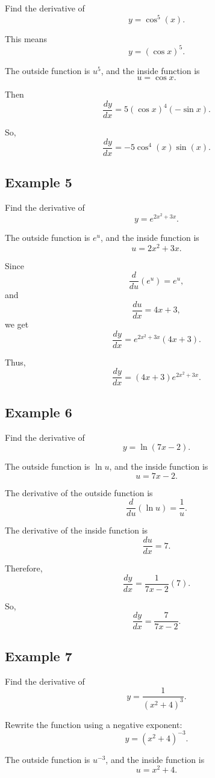 \documentclass[12pt]{article}
\begin{document}
	Find the derivative of
	\[
	y=\cos^5(x).
	\]
	
	This means
	\[
	y=(\cos x)^5.
	\]
	
	The outside function is \(u^5\), and the inside function is
	\[
	u=\cos x.
	\]
	
	Then
	\[
	\frac{dy}{dx}=5(\cos x)^4(-\sin x).
	\]
	
	So,
	\[
	\boxed{\frac{dy}{dx}=-5\cos^4(x)\sin(x).}
	\]
	
	\subsection*{Example 5}
	
	Find the derivative of
	\[
	y=e^{2x^2+3x}.
	\]
	
	The outside function is \(e^u\), and the inside function is
	\[
	u=2x^2+3x.
	\]
	
	Since
	\[
	\frac{d}{du}(e^u)=e^u,
	\]
	and
	\[
	\frac{du}{dx}=4x+3,
	\]
	we get
	\[
	\frac{dy}{dx}=e^{2x^2+3x}(4x+3).
	\]
	
	Thus,
	\[
	\boxed{\frac{dy}{dx}=(4x+3)e^{2x^2+3x}.}
	\]
	
	\subsection*{Example 6}
	
	Find the derivative of
	\[
	y=\ln(7x-2).
	\]
	
	The outside function is \(\ln u\), and the inside function is
	\[
	u=7x-2.
	\]
	
	The derivative of the outside function is
	\[
	\frac{d}{du}(\ln u)=\frac{1}{u}.
	\]
	
	The derivative of the inside function is
	\[
	\frac{du}{dx}=7.
	\]
	
	Therefore,
	\[
	\frac{dy}{dx}=\frac{1}{7x-2}(7).
	\]
	
	So,
	\[
	\boxed{\frac{dy}{dx}=\frac{7}{7x-2}.}
	\]
	
	\subsection*{Example 7}
	
	Find the derivative of
	\[
	y=\frac{1}{(x^2+4)^3}.
	\]
	
	Rewrite the function using a negative exponent:
	\[
	y=(x^2+4)^{-3}.
	\]
	
	The outside function is \(u^{-3}\), and the inside function is
	\[
	u=x^2+4.
	\]
	
\end{document}

